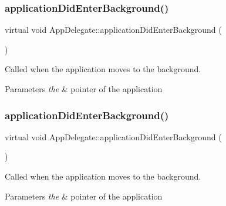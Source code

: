 \subsubsection{\texorpdfstring{application\+Did\+Enter\+Background()}{applicationDidEnterBackground()}\hspace{0.1cm}{\footnotesize\ttfamily [2/4]}}
{\footnotesize\ttfamily virtual void App\+Delegate\+::application\+Did\+Enter\+Background (\begin{DoxyParamCaption}{ }\end{DoxyParamCaption})\hspace{0.3cm}{\ttfamily [virtual]}}



Called when the application moves to the background. 


\begin{DoxyParams}{Parameters}
{\em the} & pointer of the application \\
\hline
\end{DoxyParams}
\mbox{\label{classAppDelegate_a852ad7535f0df46885c2a36d3f17a0e8}} 
\subsubsection{\texorpdfstring{application\+Did\+Enter\+Background()}{applicationDidEnterBackground()}\hspace{0.1cm}{\footnotesize\ttfamily [3/4]}}
{\footnotesize\ttfamily virtual void App\+Delegate\+::application\+Did\+Enter\+Background (\begin{DoxyParamCaption}{ }\end{DoxyParamCaption})\hspace{0.3cm}{\ttfamily [virtual]}}



Called when the application moves to the background. 


\begin{DoxyParams}{Parameters}
{\em the} & pointer of the application \\
\hline
\end{DoxyParams}
\mbox{\label{classAppDelegate_a852ad7535f0df46885c2a36d3f17a0e8}} 
